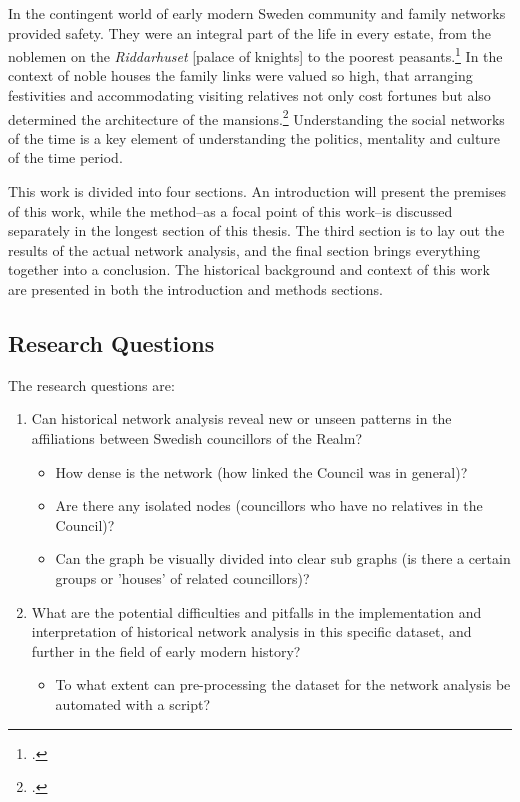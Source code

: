 In the contingent world of early modern Sweden community and family networks provided safety. They were an integral part of the life in every estate, from the noblemen on the \textit{Riddarhuset} [palace of knights] to the poorest peasants.\footcite[pp. 27-28.]{hopesAndFearsIntro} In the context of noble houses the family links were valued so high, that arranging festivities and accommodating visiting relatives not only cost fortunes but also determined the architecture of the mansions.\footcite[pp. 185-189.]{hakanenAndKoskinen2020} Understanding the social networks of the time is a key element of understanding the politics, mentality and culture of the time period.  

This work is divided into four sections. An introduction will present the premises of this work, while the method–as a focal point of this work–is discussed separately in the longest section of this thesis. The third section is to lay out the results of the actual network analysis, and the final section brings everything together into a conclusion. The historical background and context of this work are presented in both the introduction and methods sections. 

\subsection{Research Questions}
The research questions are:
\begin{enumerate}
	\item Can historical network analysis reveal new or unseen patterns in the affiliations between Swedish councillors of the Realm? \begin{itemize}
		\item How dense is the network (how linked the Council was in general)?
		\item Are there any isolated nodes (councillors who have no relatives in the Council)?
		\item Can the graph be visually divided into clear sub graphs (is there a certain groups or 'houses' of related councillors)?
	\end{itemize}	
	\item What are the potential difficulties and pitfalls in the implementation and interpretation of historical network analysis in this specific dataset, and further in the field of early modern history? \begin{itemize}	
		\item To what extent can pre-processing the dataset for the network analysis be automated with a script?
	\end{itemize}
\end{enumerate} 


